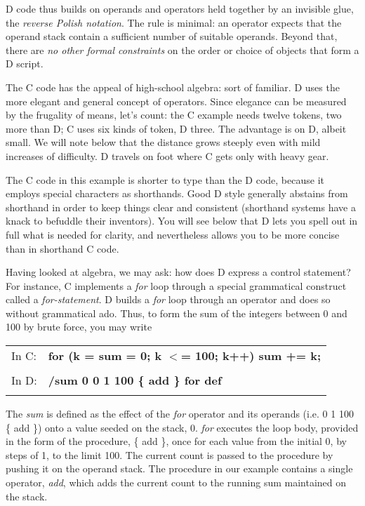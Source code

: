 \noindent D  code  thus  builds  on operands and operators  held  together  by  an invisible  glue,  the \emph{reverse Polish notation}.  The rule is  minimal:  an operator  expects that the operand stack contain a sufficient  number  of suitable operands.  Beyond that, there are \emph{no other formal constraints} on the order or choice of objects that form a D script.

The C code has the appeal of high-school algebra:  sort of  familiar.  D uses  the more elegant and general  concept  of  operators.  Since elegance can be measured by the frugality of means,  let's count:  the  C example needs twelve tokens,  two more than D; C uses six kinds of token, D three. The advantage is on D, albeit small. We will note below that the distance grows steeply even with mild increases of difficulty.  D travels on foot where C gets only with heavy gear.

The C code in this example is shorter to type than the D  code,  because it  employs  special characters as shorthands.  Good  D  style  generally abstains  from  shorthand in order to keep things  clear  and  consistent (shorthand  systems have a knack to befuddle their inventors).  You  will see  below that D lets you spell out in full what is needed for  clarity, and nevertheless allows you to be more concise than in shorthand C code.

Having  looked  at algebra,  we may ask:  how does D express  a  control statement?  For  instance,  C implements a \emph{for} loop through  a  special grammatical  construct called a \emph{for-statement}.  D builds a  \emph{for}  loop through an operator and does so without grammatical ado.  Thus,  to  form the sum of the integers between 0 and 100 by brute force, you may write\\

\begin{tabular}{>{\normalfont}l>{\sffamily\bfseries}l}

In C: & for (k = sum = 0; k $<$= 100; k++)  sum += k;\\\\

In D: & /sum 0   0 1 100 \{ add \} for   def\\\\

\end{tabular}

\noindent The  \emph{sum}  is  defined  as the effect of the  \emph{for}  operator  and  its operands  (i.e.  0 1 100 \{ add \}) onto a value seeded on the  stack,  0. \emph{for} executes  the loop body, provided in the form of the procedure,  \{ add \}, once  for  each value from the initial 0,  by steps of 1,  to the limit 100.  The current count is passed to the procedure by pushing it on the operand stack.  The procedure in our example contains a single operator,  \emph{add},  which  adds the current count to the running sum maintained on the stack.

